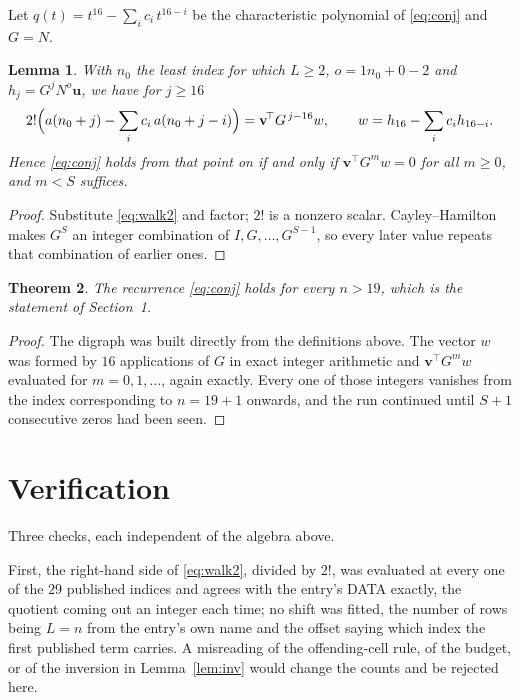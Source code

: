 \documentclass[11pt,a4paper]{article}
\theoremstyle{plain}
\newtheorem{theorem}{Theorem}
\newtheorem{lemma}[theorem]{Lemma}
\theoremstyle{definition}
\begin{document}
Let $q(t)=t^{16}-\sum_i c_i\,t^{16-i}$ be the characteristic polynomial of
\eqref{eq:conj} and $G=N$.

\begin{lemma}\label{lem:crit}
With $n_0$ the least index for which $L\ge2$, $o=1n_0+0-2$ and
$h_j=G^{j}N^{o}\mathbf{u}$, we have for $j\ge16$
\[
2!\Bigl(a(n_0+j)-\sum_i c_i\,a(n_0+j-i)\Bigr)=\mathbf{v}^{\!\top}G^{\,j-16}w,
\qquad w=h_{16}-\sum_i c_i h_{16-i} .
\]
Hence \eqref{eq:conj} holds from that point on if and only if
$\mathbf{v}^{\!\top}G^{m}w=0$ for all $m\ge0$, and $m<S$ suffices.
\end{lemma}

\begin{proof}
Substitute \eqref{eq:walk2} and factor; $2!$ is a nonzero scalar. Cayley--Hamilton
makes $G^{S}$ an integer combination of $I,G,\dots,G^{S-1}$, so every later value repeats
that combination of earlier ones.
\end{proof}

\begin{theorem}
The recurrence \eqref{eq:conj} holds for every $n>19$, which is the statement of
Section~1.
\end{theorem}

\begin{proof}
The digraph was built directly from the definitions above. The vector $w$ was formed by
$16$ applications of $G$ in exact integer arithmetic and $\mathbf{v}^{\!\top}G^{m}w$
evaluated for $m=0,1,\dots$, again exactly. Every one of those integers vanishes from the
index corresponding to $n=19+1$ onwards, and the run continued until $S+1$ consecutive
zeros had been seen.
\end{proof}

\section{Verification}

Three checks, each independent of the algebra above.

First, the right-hand side of \eqref{eq:walk2}, divided by $2!$, was evaluated at every
one of the $29$ published indices and agrees with the entry's DATA exactly, the quotient
coming out an integer each time; no shift was fitted, the number of rows being
$L=n$ from the entry's own name and the offset saying which index the first published
term carries. A misreading of the offending-cell rule, of the budget, or of the inversion in
Lemma~\ref{lem:inv} would change the counts and be rejected here.
\end{document}
